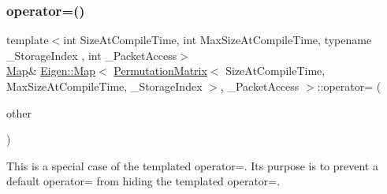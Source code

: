 \mbox{\label{class_eigen_1_1_map_3_01_permutation_matrix_3_01_size_at_compile_time_00_01_max_size_at_compile_2f9d18bf0084dbfb13fbbfe14adaf22d_a209e4e7eee11a5ca52dbb5c3ec1ffa44}} 
\subsubsection{\texorpdfstring{operator=()}{operator=()}\hspace{0.1cm}{\footnotesize\ttfamily [5/6]}}
{\footnotesize\ttfamily template$<$int Size\+At\+Compile\+Time, int Max\+Size\+At\+Compile\+Time, typename \+\_\+\+Storage\+Index , int \+\_\+\+Packet\+Access$>$ \\
\hyperlink{group___core___module_class_eigen_1_1_map}{Map}\& \hyperlink{group___core___module_class_eigen_1_1_map}{Eigen\+::\+Map}$<$ \hyperlink{group___core___module_class_eigen_1_1_permutation_matrix}{Permutation\+Matrix}$<$ Size\+At\+Compile\+Time, Max\+Size\+At\+Compile\+Time, \+\_\+\+Storage\+Index $>$, \+\_\+\+Packet\+Access $>$\+::operator= (\begin{DoxyParamCaption}\item[{const \hyperlink{group___core___module_class_eigen_1_1_map}{Map}$<$ \hyperlink{group___core___module_class_eigen_1_1_permutation_matrix}{Permutation\+Matrix}$<$ Size\+At\+Compile\+Time, Max\+Size\+At\+Compile\+Time, \+\_\+\+Storage\+Index $>$, \+\_\+\+Packet\+Access $>$ \&}]{other }\end{DoxyParamCaption})\hspace{0.3cm}{\ttfamily [inline]}}

This is a special case of the templated operator=. Its purpose is to prevent a default operator= from hiding the templated operator=. 

